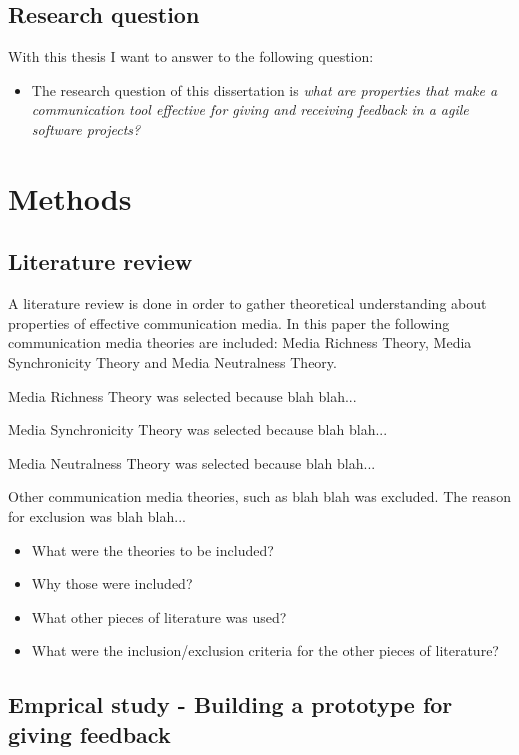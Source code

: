 \documentclass[english,12pt,a4paper,pdftex]{article}
\begin{document}
\subsection{Research question}

With this thesis I want to answer to the following question:

\begin{itemize}
\item The research question of this dissertation is \textit{what are properties that make a communication tool effective for giving and receiving feedback in a agile software projects?}
\end{itemize}

\clearpage

\section{Methods}

\subsection{Literature review}

A literature review is done in order to gather theoretical understanding about properties of effective communication media. In this paper the following communication media theories are included: Media Richness Theory, Media Synchronicity Theory and Media Neutralness Theory. 

Media Richness Theory was selected because blah blah...

Media Synchronicity Theory was selected because blah blah...

Media Neutralness Theory was selected because blah blah...

Other communication media theories, such as blah blah was excluded. The reason for exclusion was blah blah...

\begin{itemize}
\item What were the theories to be included?
\item Why those were included?
\item What other pieces of literature was used?
\item What were the inclusion/exclusion criteria for the other pieces of literature?
\end{itemize}

\subsection{Emprical study - Building a prototype for giving feedback}
\end{document}
